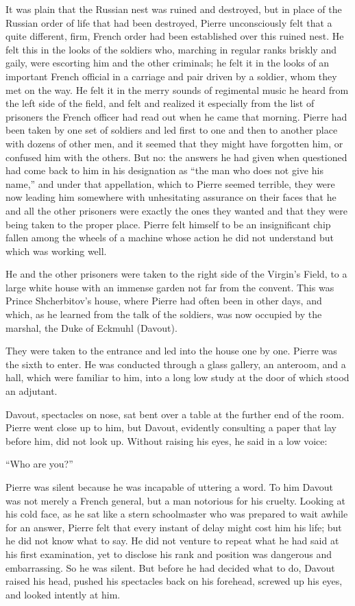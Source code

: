 It was plain that the Russian nest was ruined and destroyed, but
in place of the Russian order of life that had been destroyed,
Pierre unconsciously felt that a quite different, firm, French
order had been established over this ruined nest. He felt this in
the looks of the soldiers who, marching in regular ranks briskly
and gaily, were escorting him and the other criminals; he felt it
in the looks of an important French official in a carriage and
pair driven by a soldier, whom they met on the way. He felt it in
the merry sounds of regimental music he heard from the left side
of the field, and felt and realized it especially from the list
of prisoners the French officer had read out when he came that
morning. Pierre had been taken by one set of soldiers and led
first to one and then to another place with dozens of other men,
and it seemed that they might have forgotten him, or confused him
with the others. But no: the answers he had given when questioned
had come back to him in his designation as ``the man who does not
give his name,'' and under that appellation, which to Pierre
seemed terrible, they were now leading him somewhere with
unhesitating assurance on their faces that he and all the other
prisoners were exactly the ones they wanted and that they were
being taken to the proper place. Pierre felt himself to be an
insignificant chip fallen among the wheels of a machine whose
action he did not understand but which was working well.

He and the other prisoners were taken to the right side of the
Virgin's Field, to a large white house with an immense garden not
far from the convent. This was Prince Shcherbitov's house, where
Pierre had often been in other days, and which, as he learned
from the talk of the soldiers, was now occupied by the marshal,
the Duke of Eckmuhl (Davout).

They were taken to the entrance and led into the house one by
one.  Pierre was the sixth to enter. He was conducted through a
glass gallery, an anteroom, and a hall, which were familiar to
him, into a long low study at the door of which stood an
adjutant.

Davout, spectacles on nose, sat bent over a table at the further
end of the room. Pierre went close up to him, but Davout,
evidently consulting a paper that lay before him, did not look
up. Without raising his eyes, he said in a low voice:

``Who are you?''

Pierre was silent because he was incapable of uttering a word. To
him Davout was not merely a French general, but a man notorious
for his cruelty. Looking at his cold face, as he sat like a stern
schoolmaster who was prepared to wait awhile for an answer,
Pierre felt that every instant of delay might cost him his life;
but he did not know what to say. He did not venture to repeat
what he had said at his first examination, yet to disclose his
rank and position was dangerous and embarrassing. So he was
silent. But before he had decided what to do, Davout raised his
head, pushed his spectacles back on his forehead, screwed up his
eyes, and looked intently at him.

